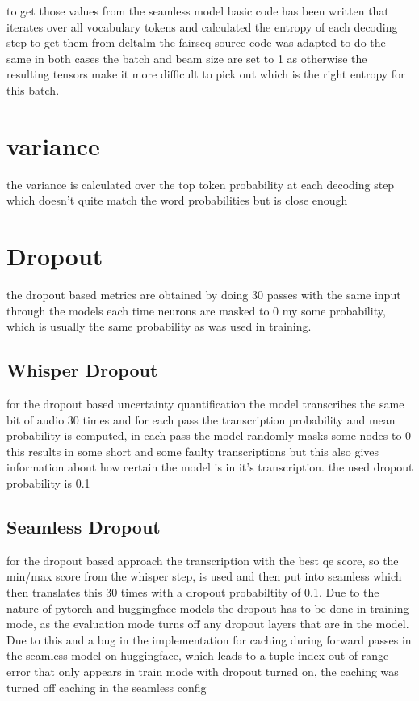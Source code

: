 to get those values from the seamless model basic code has been written that iterates over all vocabulary tokens and calculated the entropy of each decoding step
to get them from deltalm the fairseq source code was adapted to do the same
in both cases the batch and beam size are set to 1 as otherwise the resulting tensors make it more difficult to pick out which is the right entropy for this batch. 

\section{variance}
the variance is calculated over the top token probability at each decoding step 
which doesn't quite match the word probabilities but is close enough 
\section{Dropout}
the dropout based metrics are obtained by doing 30 passes with the same input through the models each time neurons are masked to 0 my some probability, which is usually the same probability as was used in training. 

\subsection{Whisper Dropout}
for the dropout based uncertainty quantification the model transcribes the same bit of audio 30 times and for each pass the transcription probability and mean probability is computed, in each pass the model randomly masks some nodes to 0
this results in some short and some faulty transcriptions but this also gives information about how certain the model is in it's transcription. the used dropout probability is 0.1 


\subsection{Seamless Dropout}
for the dropout based approach the transcription with the best qe score, so the min/max score from the whisper step, is used 
and then put into seamless which then translates this 30 times with a dropout probabiltity of 0.1.
Due to the nature of pytorch and huggingface models the dropout has to be done in training mode, as the evaluation mode turns off any dropout layers that are in the model. Due to this and a bug in the implementation for caching during forward passes in the seamless model on huggingface, which leads to a tuple index out of range error that only appears in train mode with dropout turned on, the caching was turned off caching in the seamless config

